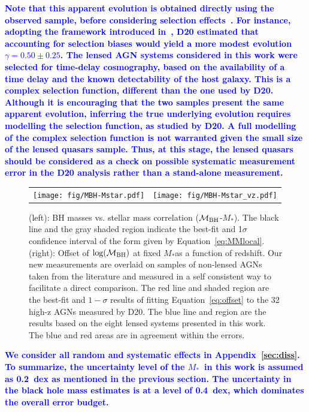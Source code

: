 \documentclass[fleqn,usenatbib]{mnras}
\newcommand{\mbh}{$\mathcal M_{\rm BH}$}
\newcommand{\mstar}{{$M_*$}}
\newcommand{\blue}[1]{{\bf \textcolor{blue}{#1}}}
\begin{document}
\blue{
Note that this apparent evolution is obtained directly using the observed sample, before considering selection effects~\citep{Tre++07,Schulze2011,Bennert++2011, Schulze2014,Park15}. For instance, adopting the framework introduced in~\citet{Schulze2015}, D20 estimated that accounting for selection biases would yield a more modest evolution $\gamma=0.50\pm0.25$. The lensed AGN systems considered in this work were selected for time-delay cosmography, based on the availability of a time delay and the known detectability of the host galaxy. This is a complex selection function, different than the one used by D20. Although it is encouraging that the two samples present the same apparent evolution, inferring the true underlying evolution requires modelling the selection function, as studied by D20. A full modelling of the complex selection function is not warranted given the small size of the lensed quasars sample. Thus, at this stage, the lensed quasars should be considered as a check on possible systematic measurement error in the D20 analysis rather than a stand-alone measurement.}


\begin{figure}
\centering
\begin{tabular}{c c}
{\texttt{[image: fig/MBH-Mstar.pdf]}}&
{\texttt{[image: fig/MBH-Mstar\_vz.pdf]}}\\
\end{tabular}
\caption{\label{fig:scaling_relation} 
(left): BH masses vs. stellar mass correlation (\mbh-\mstar). The black line and the gray shaded region indicate the best-fit and 1$\sigma$ confidence interval of the form given by Equation~\ref{eq:MMlocal}.
(right): Offset of $\log(\mathcal M_{\rm BH})$ at fixed \mstar as a function of redshift. Our new measurements are overlaid on samples of non-lensed AGNs taken from the literature and measured in a self consistent way to facilitate a direct comparison. The red line and shaded region are the best-fit and $1-\sigma$ results of fitting  Equation~\eqref{eq:offset} to the 32 high-z AGNs measured by D20. The blue line and region are the results based on the eight lensed systems presented in this work. The blue and red areas are in agreement within the errors.}
\end{figure} 

\blue{
We consider all random and systematic effects in Appendix~\ref{sec:diss}. To summarize, the uncertainty level of the \mstar\ in this work is assumed as 0.2~dex  as mentioned in the previous section. The uncertainty in the black hole mass estimates is at a level of 0.4~dex, which dominates the overall error budget.
}
\end{document}
